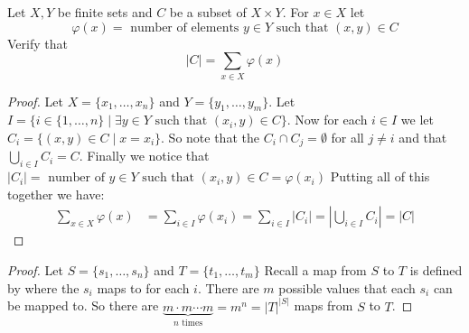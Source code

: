 \begin{exercise}
    Let $X,Y$ be finite sets and $C$ be a subset of $X\times Y$. For $x\in X$ let \[\varphi(x) = \text{ number of elements }y\in Y\text{ such that }(x,y)\in C\]
    Verify that \[
    |C| = \sum_{x\in X}\varphi(x)    
\]
    \begin{proof}
    Let $X = \{x_1,\ldots,x_n\}$ and $Y = \{y_1,\ldots,y_m\}$. Let $I = \{i\in \{1,\ldots, n\} \mid \exists y\in Y \text{ such that } (x_i,y)\in C\}$. 
    Now for each $i\in I$ we let  $C_i = \{(x,y)\in C \mid x = x_i\}$. So note that the $C_i\cap C_j = \emptyset$ for all $j\neq i$ and that  $\bigcup_{i\in I} C_i = C$.
    Finally we notice that $|C_i| = \text{ number of }y\in Y\text{ such that } (x_i,y)\in C = \varphi(x_i)$
    Putting all of this together we have: \begin{align*}
    \sum_{x\in X}\varphi(x) &= \sum_{i\in I}\varphi(x_i) = \sum_{i\in I}|C_i| = |\bigcup_{i\in I}C_i| = |C|
\end{align*}
    
\end{proof}
\end{exercise}
\begin{exercise}
    \begin{proof}
    Let $S = \{s_1,\ldots,s_n\}$ and $T = \{t_1,\ldots,t_m\}$
    Recall a map from  $S$ to $T$ is defined by where the $s_i$ maps to for each $i$. There are $m$ possible values that each $s_i$ can be mapped to. So there are  $\underbrace{m\cdot m \cdots m}_{n\text{ times}} = m^n = |T|^{|S|}$
    maps from $S$ to $T$.
\end{proof}    
\end{exercise}

